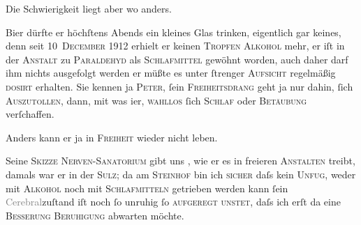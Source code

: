 \pstart
           Die Schwierigkeit liegt aber wo anders.\pend
           
\pstart
           Bier dürfte er höchſtens Abends ein kleines Glas trinken, eigentlich gar keines, denn
               seit 10 \textsc{December} 1912 erhielt er keinen \textsc{Tropfen Alkohol} mehr, er iſt in der \textsc{Anstalt} zu \textsc{Paraldehyd} als \textsc{Schlafmittel} gewöhnt {\pb}worden, auch daher darf
               ihm nichts ausgefolgt werden er müßte es unter ſtrenger \textsc{Aufsicht} regelmäßig \textsc{dosirt} erhalten. Sie kennen ja
                  \textsc{Peter}, ſein \textsc{Freiheitsdrang} geht ja nur dahin, ſich \textsc{Auszutollen}, dann, mit was i{\geminationm}er, \textsc{wahllos} ſich \textsc{Schlaf} oder
                  \textsc{Betäubung} verſchaffen.\pend
           
\pstart
           Anders kann er ja in \textsc{Freiheit} wieder nicht leben.\pend
           
\pstart
           Seine \textsc{Skizze}{ }\textsc{Nerven-Sanatorium} gibt uns \label{K_L02123-1v}\label{K_L02123-1}, wie er es in freieren \textsc{An{\pb}stalten} treibt, damals war
               er in der \textsc{Sulz}; da am \textsc{Steinhof} bin ich \textsc{sicher} daſs kein \textsc{Unfug}, weder mit \textsc{Alkohol} noch mit \textsc{Schlafmitteln} getrieben werden kann {\kaufmannsund} ſein \textcolor{gray}{Cerebral}zuſtand iſt noch ſo
               unruhig ſo \textsc{aufgeregt}{ }{\kaufmannsund}{ }\textsc{unstet}, daſs ich erſt da eine \textsc{Beſſerung}{ }{\kaufmannsund}{ }\textsc{Beruhigung} abwarten möchte.\pend
           
